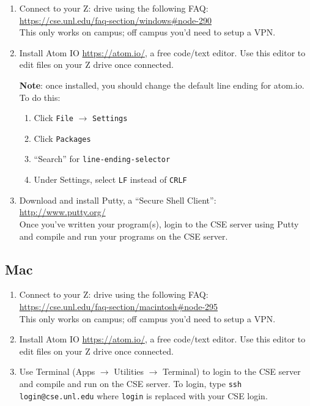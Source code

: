 \documentclass[12pt]{scrartcl}
\begin{document}
\begin{enumerate} 
  \item Connect to your Z: drive using the following FAQ: \\
  \url{https://cse.unl.edu/faq-section/windows#node-290}\\
  This only works on campus; off campus you'd need to setup a VPN.
  \item Install Atom IO \url{https://atom.io/}, a free code/text 
  editor.  Use this editor to edit files on your Z drive once connected.
  
  \textbf{Note}: once installed, you should change the default line ending
  for atom.io.  To do this:
  \begin{enumerate}
    \item Click \texttt{File} $\rightarrow$ \texttt{Settings}
    \item Click \texttt{Packages}
    \item ``Search'' for \texttt{line-ending-selector}
    \item Under Settings, select \texttt{LF} instead of \texttt{CRLF}
  \end{enumerate}
  
  \item Download and install Putty, a ``Secure Shell Client'': \\
  \url{http://www.putty.org/}\\
  Once you've written your program(s), login to the CSE server
  using Putty and compile and run your programs on the CSE server.
\end{enumerate}

\subsection*{Mac}

\begin{enumerate}
  \item Connect to your Z: drive using the following FAQ: \\
  \url{https://cse.unl.edu/faq-section/macintosh#node-295}\\
  This only works on campus; off campus you'd need to setup a VPN.
  \item Install Atom IO \url{https://atom.io/}, a free code/text 
  editor.  Use this editor to edit files on your Z drive once connected.
  \item Use Terminal (Apps $\rightarrow$ Utilities $\rightarrow$ Terminal) to
  login to the CSE server and compile and run on the CSE server.  To login, type
  \texttt{ssh login@cse.unl.edu} where \texttt{login} 
  is replaced with your CSE login.
\end{enumerate}
\end{document}

